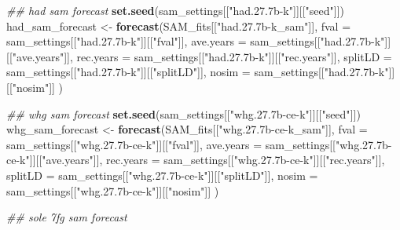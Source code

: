 \documentclass[
]{article}
\newenvironment{Shaded}{\begin{snugshade}}{\end{snugshade}}
\newcommand{\CommentTok}[1]{\textcolor[rgb]{0.56,0.35,0.01}{\textit{#1}}}
\newcommand{\DataTypeTok}[1]{\textcolor[rgb]{0.13,0.29,0.53}{#1}}
\newcommand{\KeywordTok}[1]{\textcolor[rgb]{0.13,0.29,0.53}{\textbf{#1}}}
\newcommand{\NormalTok}[1]{#1}
\newcommand{\StringTok}[1]{\textcolor[rgb]{0.31,0.60,0.02}{#1}}
\begin{document}
\begin{Shaded}
\begin{Highlighting}[]
{{{        \CommentTok{## had sam forecast}
        \KeywordTok{set.seed}\NormalTok{(sam_settings[[}\StringTok{"had.27.7b-k"}\NormalTok{]][[}\StringTok{"seed"}\NormalTok{]])}
\NormalTok{        had_sam_forecast <-}\StringTok{ }\KeywordTok{forecast}\NormalTok{(SAM_fits[[}\StringTok{"had.27.7b-k_sam"}\NormalTok{]], }
                         \DataTypeTok{fval =}\NormalTok{ sam_settings[[}\StringTok{"had.27.7b-k"}\NormalTok{]][[}\StringTok{"fval"}\NormalTok{]],}
                         \DataTypeTok{ave.years =}\NormalTok{ sam_settings[[}\StringTok{"had.27.7b-k"}\NormalTok{]][[}\StringTok{"ave.years"}\NormalTok{]],}
                         \DataTypeTok{rec.years =}\NormalTok{ sam_settings[[}\StringTok{"had.27.7b-k"}\NormalTok{]][[}\StringTok{"rec.years"}\NormalTok{]],}
                         \DataTypeTok{splitLD =}\NormalTok{ sam_settings[[}\StringTok{"had.27.7b-k"}\NormalTok{]][[}\StringTok{"splitLD"}\NormalTok{]],}
                         \DataTypeTok{nosim =}\NormalTok{ sam_settings[[}\StringTok{"had.27.7b-k"}\NormalTok{]][[}\StringTok{"nosim"}\NormalTok{]]}
\NormalTok{        )}
        
        \CommentTok{## whg sam forecast}
        \KeywordTok{set.seed}\NormalTok{(sam_settings[[}\StringTok{"whg.27.7b-ce-k"}\NormalTok{]][[}\StringTok{"seed"}\NormalTok{]])}
\NormalTok{        whg_sam_forecast <-}\StringTok{ }\KeywordTok{forecast}\NormalTok{(SAM_fits[[}\StringTok{"whg.27.7b-ce-k_sam"}\NormalTok{]], }
                         \DataTypeTok{fval =}\NormalTok{ sam_settings[[}\StringTok{"whg.27.7b-ce-k"}\NormalTok{]][[}\StringTok{"fval"}\NormalTok{]],}
                         \DataTypeTok{ave.years =}\NormalTok{ sam_settings[[}\StringTok{"whg.27.7b-ce-k"}\NormalTok{]][[}\StringTok{"ave.years"}\NormalTok{]],}
                         \DataTypeTok{rec.years =}\NormalTok{ sam_settings[[}\StringTok{"whg.27.7b-ce-k"}\NormalTok{]][[}\StringTok{"rec.years"}\NormalTok{]],}
                         \DataTypeTok{splitLD =}\NormalTok{ sam_settings[[}\StringTok{"whg.27.7b-ce-k"}\NormalTok{]][[}\StringTok{"splitLD"}\NormalTok{]],}
                         \DataTypeTok{nosim =}\NormalTok{ sam_settings[[}\StringTok{"whg.27.7b-ce-k"}\NormalTok{]][[}\StringTok{"nosim"}\NormalTok{]]}
\NormalTok{        )}
        
        \CommentTok{## sole 7fg sam forecast}
        
}}}
\end{Highlighting}
\end{Shaded}
\end{document}
